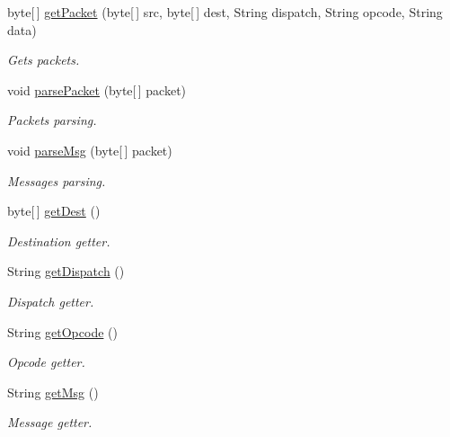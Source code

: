 \begin{DoxyCompactItemize}
\item 
byte\mbox{[}$\,$\mbox{]} \hyperlink{classcom_1_1mobii_1_1protocol_1_1_tcp_packet_a7f30a0589465a83aeb39e049187418bb}{get\-Packet} (byte\mbox{[}$\,$\mbox{]} src, byte\mbox{[}$\,$\mbox{]} dest, String dispatch, String opcode, String data)
\begin{DoxyCompactList}\small\item\em Gets packets. \end{DoxyCompactList}\item 
void \hyperlink{classcom_1_1mobii_1_1protocol_1_1_tcp_packet_ae337cb8003fd067f5c45109cf91afb2e}{parse\-Packet} (byte\mbox{[}$\,$\mbox{]} packet)
\begin{DoxyCompactList}\small\item\em Packets parsing. \end{DoxyCompactList}\item 
void \hyperlink{classcom_1_1mobii_1_1protocol_1_1_tcp_packet_abc8e79a24ff0eb7bae67e214698201e2}{parse\-Msg} (byte\mbox{[}$\,$\mbox{]} packet)
\begin{DoxyCompactList}\small\item\em Messages parsing. \end{DoxyCompactList}\item 
byte\mbox{[}$\,$\mbox{]} \hyperlink{classcom_1_1mobii_1_1protocol_1_1_tcp_packet_a3001fbd72e206e59f42cc686041385ba}{get\-Dest} ()
\begin{DoxyCompactList}\small\item\em Destination getter. \end{DoxyCompactList}\item 
String \hyperlink{classcom_1_1mobii_1_1protocol_1_1_tcp_packet_ab9a61518a373d2a8cadf580699c1dc04}{get\-Dispatch} ()
\begin{DoxyCompactList}\small\item\em Dispatch getter. \end{DoxyCompactList}\item 
String \hyperlink{classcom_1_1mobii_1_1protocol_1_1_tcp_packet_a71e701f9a9b89e9b9d40d0bdc59da12a}{get\-Opcode} ()
\begin{DoxyCompactList}\small\item\em Opcode getter. \end{DoxyCompactList}\item 
String \hyperlink{classcom_1_1mobii_1_1protocol_1_1_tcp_packet_ac384ed7a57d6eda4e761876b3d02efce}{get\-Msg} ()
\begin{DoxyCompactList}\small\item\em Message getter. \end{DoxyCompactList}\item 

\end{DoxyCompactItemize}
